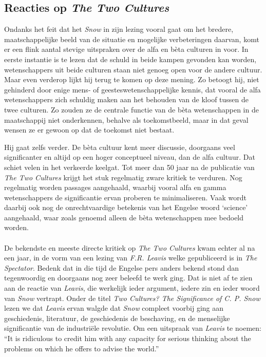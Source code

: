\subsection{Reacties op \emph{The Two Cultures}}

Ondanks het feit dat het \emph{Snow} in zijn lezing vooral gaat om het bredere, maatschappelijke beeld van de situatie en mogelijke verbeteringen daarvan, komt er een flink aantal stevige uitspraken over de alfa en b\`eta culturen in voor. In eerste instantie is te lezen dat de schuld in beide kampen gevonden kan worden, wetenschappers uit beide culturen staan niet genoeg open voor de andere cultuur. Maar even verderop lijkt hij terug te komen op deze mening. Zo betoogt hij, niet gehinderd door enige mens- of geesteswetenschappelijke kennis, dat vooral de alfa wetenschappers zich schuldig maken aan het behouden van de kloof tussen de twee culturen. Zo zouden ze de centrale functie van de b\`eta wetenschappen in de maatschappij niet onderkennen, behalve als toekomstbeeld, maar in dat geval wensen ze er gewoon op dat de toekomst niet bestaat.

Hij gaat zelfs verder. De b\`eta cultuur kent meer discussie, doorgaans veel significanter en altijd op een hoger conceptueel niveau, dan de alfa cultuur. Dat schiet velen in het verkeerde keelgat. Tot meer dan 50 jaar na de publicatie van \emph{The Two Cultures} krijgt het stuk regelmatig zware kritiek te verduren.\cite{Sparreboom} Nog regelmatig worden passages aangehaald, waarbij vooral alfa en gamma wetenschappers de significantie ervan proberen te minimaliseren. Vaak wordt daarbij ook nog de onrechtvaardige betekenis van het Engelse woord `science' aangehaald, waar zoals genoemd alleen de b\`eta wetenschappen mee bedoeld worden.

\paragraph{}

De bekendste en meeste directe kritiek op \emph{The Two Cultures} kwam echter al na een jaar, in de vorm van een lezing van \emph{F.R. Leavis}\cite{Leavis} welke gepubliceerd is in \emph{The Spectator}. Bedenk dat in die tijd de Engelse pers anders bekend stond dan tegenwoordig en doorgaans nog zeer beleefd te werk ging. Dat is niet af te zien aan de reactie van \emph{Leavis}, die werkelijk ieder argument, iedere zin en ieder woord van \emph{Snow} vertrapt. Onder de titel \emph{Two Cultures? The Significance of C. P. Snow} lezen we dat \emph{Leavis} ervan walgde dat \emph{Snow} compleet voorbij ging aan geschiedenis, literatuur, de geschiedenis de beschaving, en de menselijke significantie van de industri\"ele revolutie. Om een uitspraak van \emph{Leavis} te noemen: ``It is ridiculous to credit him with any capacity for serious thinking about the problems on which he offers to advise the world.''

